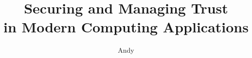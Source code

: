 \documentclass[defaultstyle,11pt]{thesis}
\title{Securing and Managing Trust\\in Modern Computing Applications}
\author{Andy}{Sayler}
\begin{document}










\nocite{*}                %

\end{document}
